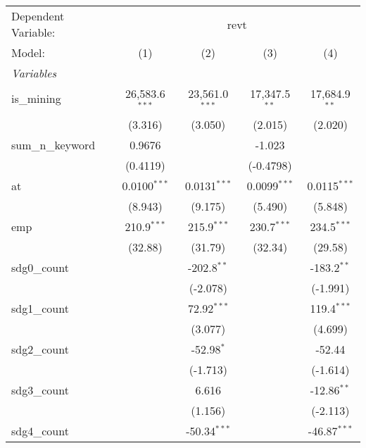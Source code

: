 
\begingroup
\centering
\begin{tabular}{lcccc}
   \tabularnewline \midrule \midrule
   Dependent Variable: & \multicolumn{4}{c}{revt}\\
   Model:            & (1)              & (2)              & (3)             & (4)\\  
   \midrule
   \emph{Variables}\\
   is\_mining        & 26,583.6$^{***}$ & 23,561.0$^{***}$ & 17,347.5$^{**}$ & 17,684.9$^{**}$\\   
                     & (3.316)          & (3.050)          & (2.015)         & (2.020)\\   
   sum\_n\_keyword   & 0.9676           &                  & -1.023          &   \\   
                     & (0.4119)         &                  & (-0.4798)       &   \\   
   at                & 0.0100$^{***}$   & 0.0131$^{***}$   & 0.0099$^{***}$  & 0.0115$^{***}$\\   
                     & (8.943)          & (9.175)          & (5.490)         & (5.848)\\   
   emp               & 210.9$^{***}$    & 215.9$^{***}$    & 230.7$^{***}$   & 234.5$^{***}$\\   
                     & (32.88)          & (31.79)          & (32.34)         & (29.58)\\   
   sdg0\_count       &                  & -202.8$^{**}$    &                 & -183.2$^{**}$\\   
                     &                  & (-2.078)         &                 & (-1.991)\\   
   sdg1\_count       &                  & 72.92$^{***}$    &                 & 119.4$^{***}$\\   
                     &                  & (3.077)          &                 & (4.699)\\   
   sdg2\_count       &                  & -52.98$^{*}$     &                 & -52.44\\   
                     &                  & (-1.713)         &                 & (-1.614)\\   
   sdg3\_count       &                  & 6.616            &                 & -12.86$^{**}$\\   
                     &                  & (1.156)          &                 & (-2.113)\\   
   sdg4\_count       &                  & -50.34$^{***}$   &                 & -46.87$^{***}$\\   

\end{tabular}
